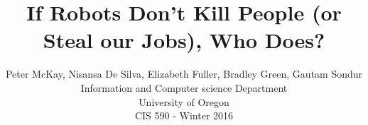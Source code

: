 \documentclass[12pt,twocolumn]{IEEEtran11}
\begin{document}


\title{\Large \bf If Robots Don't Kill People (or Steal our Jobs), Who Does?
}
\author{
Peter McKay, Nisansa De Silva, Elizabeth Fuller, Bradley Green, 
Gautam Sondur\\
Information and Computer science Department\\
University of Oregon\\
CIS 590 - Winter 2016\\
}
\maketitle





%
%
%
%


\end{document}
